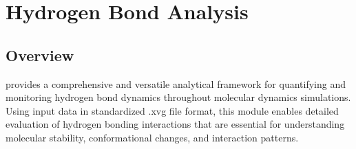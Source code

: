 \documentclass[a4paper,10pt,english]{sphinxmanual}
\begin{document}
\begin{sphinxVerbatim}[commandchars=\\\{\}]

       
       
    \PYG{p}{[}\PYG{p}{]}  

   
     

  
  
\end{sphinxVerbatim}

\sphinxstepscope


\chapter{Hydrogen Bond Analysis}
\label{\detokenize{Hbond:hydrogen-bond-analysis}}\label{\detokenize{Hbond::doc}}

\section{Overview}
\label{\detokenize{Hbond:overview}}
\sphinxAtStartPar
{} provides a comprehensive and versatile analytical framework for quantifying and monitoring hydrogen bond dynamics throughout molecular dynamics simulations. Using input data in standardized .xvg file format, this module enables detailed evaluation of hydrogen bonding interactions that are essential for understanding molecular stability, conformational changes, and interaction patterns.
\end{document}

